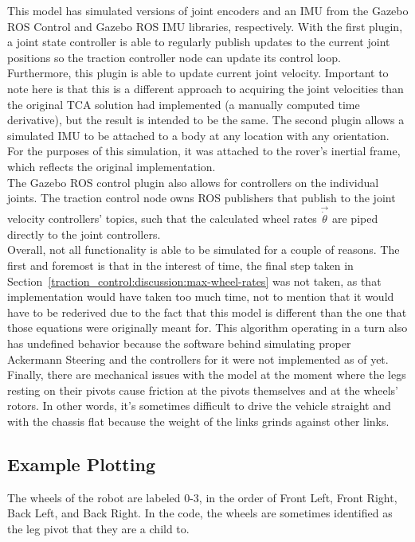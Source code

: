 This model has simulated versions of joint encoders and an \ac{IMU} from the Gazebo ROS Control and Gazebo ROS IMU libraries, respectively. With the first plugin, a joint state controller is able to regularly publish updates to the current joint positions so the traction controller node can update its control loop. Furthermore, this plugin is able to update current joint velocity. Important to note here is that this is a different approach to acquiring the joint velocities than the original \ac{TCA} solution had implemented (a manually computed time derivative), but the result is intended to be the same. The second plugin allows a simulated \ac{IMU} to be attached to a body at any location with any orientation. For the purposes of this simulation, it was attached to the rover's inertial frame, which reflects the original implementation. \\

The Gazebo ROS control plugin also allows for controllers on the individual joints. The traction control node owns ROS publishers that publish to the joint velocity controllers' topics, such that the calculated wheel rates $\vec{\dot{\theta}}$ are piped directly to the joint controllers. \\

Overall, not all functionality is able to be simulated for a couple of reasons. The first and foremost is that in the interest of time, the final step taken in Section~\ref{traction_control:discussion:max-wheel-rates} was not taken, as that implementation would have taken too much time, not to mention that it would have to be rederived due to the fact that this model is different than the one that those equations were originally meant for. This algorithm operating in a turn also has undefined behavior because the software behind simulating proper Ackermann Steering and the controllers for it were not implemented as of yet. Finally, there are mechanical issues with the model at the moment where the legs resting on their pivots cause friction at the pivots themselves and at the wheels' rotors. In other words, it's sometimes difficult to drive the vehicle straight and with the chassis flat because the weight of the links grinds against other links.

\subsection{Example Plotting}
The wheels of the robot are labeled 0-3, in the order of Front Left, Front Right, Back Left, and Back Right. In the code, the wheels are sometimes identified as the leg pivot that they are a child to. \\

